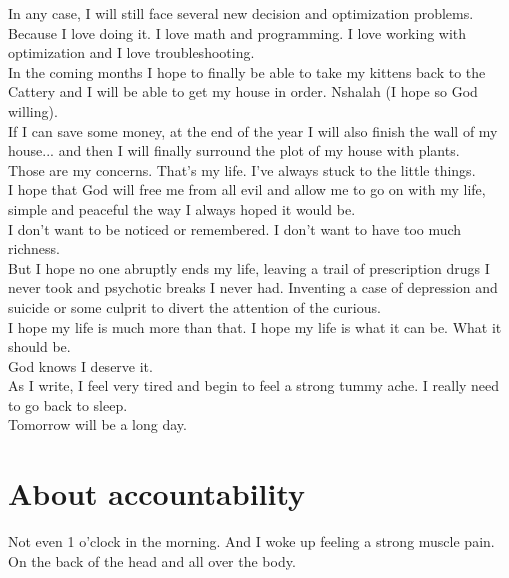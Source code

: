 \documentclass[11pt]{book}
\begin{document}
\noindent In any case, I will still face several new decision and optimization problems. Because I love doing it. I love math and programming. I love working with optimization and I love troubleshooting. \\

\noindent In the coming months I hope to finally be able to take my kittens back to the Cattery and I will be able to get my house in order. Nshalah (I hope so God willing). \\

\noindent If I can save some money, at the end of the year I will also finish the wall of my house... and then I will finally surround the plot of my house with plants. \\ 

\noindent Those are my concerns. That's my life. I've always stuck to the little things. \\

\noindent I hope that God will free me from all evil and allow me to go on with my life, simple and peaceful the way I always hoped it would be. \\

\noindent I don't want to be noticed or remembered. I don't want to have too much richness. \\

\noindent But I hope no one abruptly ends my life, leaving a trail of prescription drugs I never took and psychotic breaks I never had. Inventing a case of depression and suicide or some culprit to divert the attention of the curious. \\ 

\noindent I hope my life is much more than that. I hope my life is what it can be. What it should be. \\

\noindent God knows I deserve it. \\

\noindent As I write, I feel very tired and begin to feel a strong tummy ache. I really need to go back to sleep.  \\

\noindent Tomorrow will be a long day.

\chapter{About accountability}

\noindent Not even 1 o'clock in the morning. And I woke up feeling a strong muscle pain. On the back of the head and all over the body. \\
\end{document}
